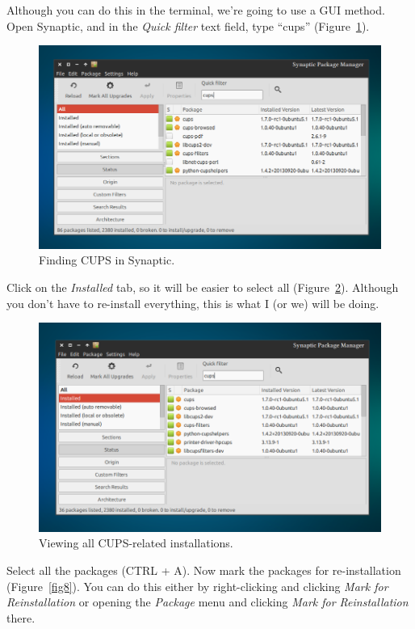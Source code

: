 \documentclass[12pt, a4paper]{article}
\begin{document}
Although you can do this in the terminal, we're going to use a GUI method. Open Synaptic, and in the \emph{Quick filter} text field, type “cups” (Figure~\ref{fig6}).

\newpage
\begin{figure}[!hbp]
  \centering
  \includegraphics[width=1\textwidth]{imgs/filter-failed-6.png}
  \caption{Finding CUPS in Synaptic.}
  \label{fig6}
\end{figure}

\noindent Click on the \emph{Installed} tab, so it will be easier to select all (Figure~\ref{fig7}). Although you don't have to re-install everything, this is what I (or we) will be doing. 

\begin{figure}[!hbp]
  \centering
  \includegraphics[width=1\textwidth]{imgs/filter-failed-7.png}
  \caption{Viewing all CUPS-related installations.}
  \label{fig7}
\end{figure}

\noindent Select all the packages (CTRL + A). Now mark the packages for re-installation (Figure~\ref{fig8}). You can do this either by right-clicking and clicking \emph{Mark for Reinstallation} or opening the \emph{Package} menu and clicking \emph{Mark for Reinstallation} there.
\end{document}
